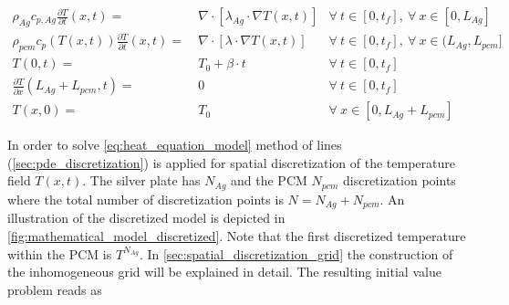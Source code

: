 \documentclass{scrartcl}[12pt, halfparskip]
\numberwithin{equation}{section}
\numberwithin{figure}{section}
\numberwithin{table}{section}
\begin{document}
\begin{subequations}
	\begin{align}
	\rho_{Ag} c_{p,Ag} \frac{\partial T}{\partial t}(x,t) = \ & \nabla \cdot \left[\lambda_{Ag} \cdot \nabla T(x,t)  \right] & \forall \ t \in [0,t_f], \ \forall \ x \in [0,L_{Ag}] \label{eq:heat_equation_Ag} \\
	\rho_{pcm} c_p(T(x,t)) \frac{\partial T}{\partial t}(x,t) = \ & \nabla \cdot \left[\lambda \cdot \nabla T(x,t)  \right]  & \forall \ t \in [0,t_f], \ \forall \ x \in (L_{Ag},L_{pcm}] \label{eq:heat_equation_PCM}  \\
	T(0,t) = \ & T_0 + \beta \cdot t & \forall \ t \in [0,t_f] \label{eq:heat_equation_BC_dirichlet} \\
	\frac{\partial T}{\partial x} (L_{Ag} + L_{pcm},t) = \ & 0 & \forall \ t \in [0,t_f] \label{eq:heat_equation_BC_Neumann}  \\
	T(x,0) = \ & T_0 & \forall \ x \in [0,L_{Ag} + L_{pcm}] \label{eq:heat_equation_start_values} 
	\end{align}
	\label{eq:heat_equation_model}
\end{subequations}


In order to solve \cref{eq:heat_equation_model} method of lines (\cref{sec:pde_discretization}) is applied for spatial discretization of the temperature field $T(x,t)$. The silver plate has $N_{Ag}$ and the PCM $N_{pcm}$ discretization points where the total number of discretization points is $N = N_{Ag} + N_{pcm}$.
An illustration of the discretized model is depicted in \cref{fig:mathematical_model_discretized}. Note that the first discretized temperature within the PCM is $T^{N_{Ag}}$.
In \cref{sec:spatial_discretization_grid} the construction of the inhomogeneous grid will be explained in detail. The resulting initial value problem reads as
\end{document}

